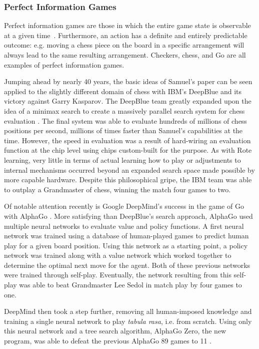 

\subsubsection*{Perfect Information Games}

Perfect information games are those in which the entire game state is observable
at a given time~\cite{perfinfo}.
%
Furthermore,
an action has a definite and entirely predictable outcome:
e.g. moving a chess piece on the board in a specific arrangement will always
lead to the same resulting arrangement.
%
Checkers, chess, and Go are all examples of perfect information games.

Jumping ahead by nearly 40 years,
the basic ideas of Samuel's paper can be seen applied to the slightly different
domain of chess with IBM's DeepBlue
and its victory against Garry Kasparov.
%
The DeepBlue team greatly expanded upon the idea of a minimax search to create a
massively parallel search system for chess evaluation
\cite{ibm_deepblue}.
%
The final system was able to evaluate hundreds of millions of chess positions
per second,
millions of times faster than Samuel's capabilities at the time.
%
However,
the speed in evaluation was a result of hard-wiring an evaluation function at
the chip level using chips custom-built for the purpose.
%
As with Rote learning,
very little in terms of actual learning how to play or adjustments to internal
mechanisms occurred
beyond an expanded search space made possible by more capable hardware.
%
Despite this philosophical gripe,
the IBM team was able to outplay a Grandmaster of chess,
winning the match four games to two.


Of notable attention recently is Google DeepMind's
success in the game of Go with AlphaGo
\cite{deepmind_alphago}.
%
More satisfying than DeepBlue's search approach,
AlphaGo used multiple neural networks to evaluate value and policy functions.
%
A first neural network was trained using a database of human-played games
to predict human play for a given board position.
%
Using this network as a starting point,
a policy network was trained
along with a value network which worked together to determine the optimal next
move for the agent.
%
Both of these previous networks were trained through self-play.
%
Eventually,
the network resulting from this self-play was able to beat Grandmaster Lee Sedol
in match play by four games to one.


DeepMind then took a step further,
removing all human-imposed knowledge and
training a single neural network to play \textit{tabula rasa}, i.e. from scratch.
%
Using only this neural network and a tree search algorithm,
AlphaGo Zero, the new program,
was able to defeat the previous AlphaGo 89 games to 11
\cite{deepmind_alphago_zero}.


